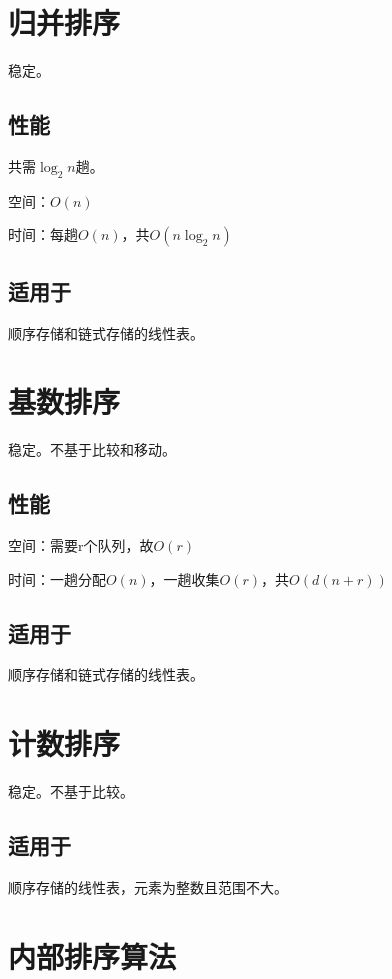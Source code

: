 \section{归并排序}
稳定。

\subsection{性能}
共需\(\log_2n\)趟。

空间：\(O(n)\)

时间：每趟\(O(n)\)，共\(O(n\log_2n)\)


\subsection{适用于}
顺序存储和链式存储的线性表。


\section{基数排序}
稳定。不基于比较和移动。

\subsection{性能}
空间：需要r个队列，故\(O(r)\)

时间：一趟分配\(O(n)\)，一趟收集\(O(r)\)，共\(O(d(n + r))\)


\subsection{适用于}
顺序存储和链式存储的线性表。


\section{计数排序}
稳定。不基于比较。

\subsection{适用于}
顺序存储的线性表，元素为整数且范围不大。


\section{内部排序算法}





